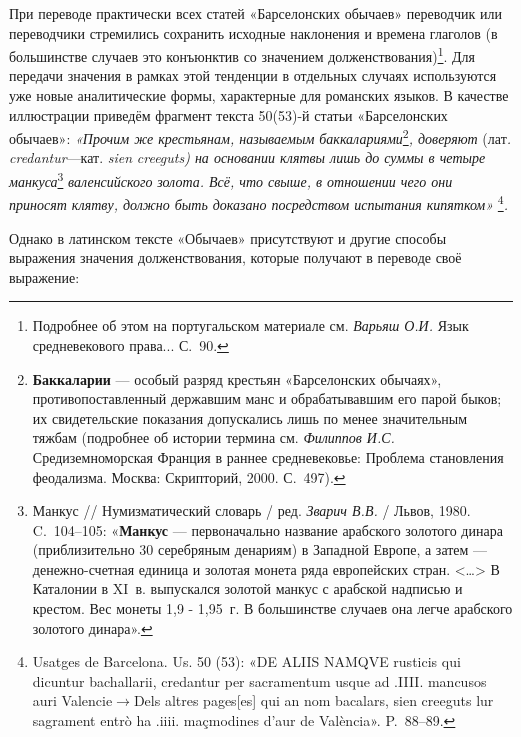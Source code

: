 При переводе практически всех статей «Барселонских обычаев» переводчик или переводчики стремились сохранить исходные наклонения и времена глаголов (в большинстве случаев это конъюнктив со значением долженствования)\footnote{Подробнее об этом на португальском материале см. \emph{Варьяш О.И.} Язык средневекового права... С.~90.}. Для передачи значения в рамках этой тенденции в отдельных случаях используются уже новые аналитические формы, характерные для романских языков. В качестве иллюстрации приведём фрагмент текста 50(53)-й статьи «Барселонских обычаев»: \emph{«Прочим же крестьянам, называемым баккалариями}\footnote{\textbf{Баккаларии} --- особый разряд крестьян «Барселонских обычаях», противопоставленный державшим манс и обрабатывавшим его парой быков; их свидетельские показания допускались лишь по менее значительным тяжбам (подробнее об истории термина см. \emph{Филиппов И.С. }Средиземноморская Франция в раннее средневековье: Проблема становления феодализма. Москва: Скрипторий, 2000. С.~497).}\emph{, доверяют }(лат\emph{.}\emph{ }\emph{credantur}---кат. \emph{sien}\emph{ }\emph{creeguts}\emph{) на основании клятвы лишь до суммы в четыре манкуса}\footnote{Манкус // Нумизматический словарь / ред. \emph{Зварич В.В. }/ Львов, 1980. C.~104--105: «\textbf{Манкус} --- первоначально название арабского золотого динара (приблизительно 30 серебряным денариям) в Западной Европе, а затем --- денежно-счетная единица и золотая монета ряда европейских стран. <…> В Каталонии в XI~в. выпускался золотой манкус с арабской надписью и крестом. Вес монеты 1,9 - 1,95~г. В большинстве случаев она легче арабского золотого динара».}\emph{ валенсийского }\emph{золота}\emph{. В}\emph{сё, что свыше, в отношении чего они приносят клятву, должно быть доказано посредством испытания кипятком»}\textsuperscript{ }\footnote{Usatges de Barcelona. Us. 50 (53): «DE ALIIS NAMQVE rusticis qui dicuntur bachallarii, credantur per sacramentum usque ad .IIII. mancusos auri Valencie$\rightarrow$Dels altres pages[es] qui an nom bacalars, sien creeguts lur sagrament entrò ha .iiii. maçmodines d’aur de València». P.~88--89.}\emph{.}

Однако в латинском тексте «Обычаев» присутствуют и другие способы выражения значения долженствования, которые получают в переводе своё выражение:


